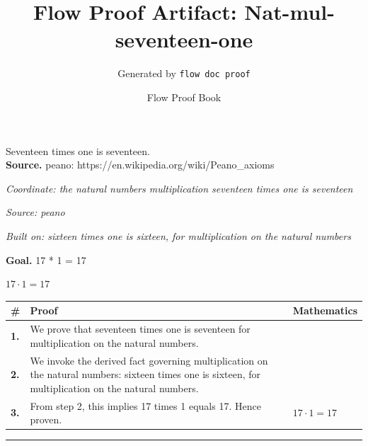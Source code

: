 \documentclass[11pt]{article}
\title{Flow Proof Artifact: Nat-mul-seventeen-one}
\author{Generated by \texttt{flow doc proof}}
\date{Flow Proof Book}
\theoremstyle{definition}
\begin{document}
\maketitle
Seventeen times one is seventeen.\\[0.5em]
\textbf{Source.} peano: https://en.wikipedia.org/wiki/Peano\_axioms\\[0.5em]
\bigskip
{}\par
\smallskip\noindent\textit{Coordinate: the natural numbers \cdot multiplication \cdot seventeen times one is seventeen}\par
\smallskip\noindent\textit{Source: peano}\par
\smallskip\noindent\textit{Built on: sixteen times one is sixteen, for multiplication on the natural numbers}\par
\medskip
\noindent\textbf{Goal.} 17 * 1 = 17\par
\noindent$\displaystyle 17 \cdot 1 = 17$\par
\medskip
\noindent
\begin{tabular}{@{} >{\raggedright\arraybackslash}p{} >{\raggedright\arraybackslash}p{} >{\raggedleft\arraybackslash}p{} @{}}
\textbf{\#} & \textbf{Proof} & \textbf{Mathematics} \\
\midrule
\textbf{1.} & We prove that seventeen times one is seventeen for multiplication on the natural numbers. & \\[0.45em]
\textbf{2.} & We invoke the derived fact governing multiplication on the natural numbers: sixteen times one is sixteen, for multiplication on the natural numbers. & \\[0.45em]
\textbf{3.} & From step 2, this implies 17 times 1 equals 17. Hence proven. & $\displaystyle 17 \cdot 1 = 17$ \\[0.45em]
\bottomrule
\end{tabular}
\label{thm:Nat-multiplication-seventeen_times_one_is_seventeen}
\par\medskip\hrule
\end{document}
